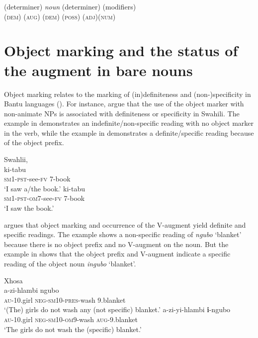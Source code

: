 \documentclass[output=paper]{langscibook}
\begin{document}
\ea\label{ex:lusekelo:51}
\gll (determiner)  \textit{noun}  (determiner)  (modifiers)\\
  {(\textsc{dem}) (\textsc{aug})}  {}  {(\textsc{dem}) (\textsc{poss})}  {(\textsc{adj})(\textsc{num})}\\
\z

\section{Object marking and the status of the augment in bare nouns} 
\label{sec:lusekelo:4}
Object marking relates to the marking of (in)definiteness and (non-)specificity in Bantu languages (\citealt{MartenEtAl2007, Riedel2009, MartenKula2012, Visser2010, Kimambo2018b}). For instance, \citet[242]{MartenKula2012} argue that the use of the object marker with non-animate NPs is associated with definiteness or specificity in Swahili. The example in  demonstrates an indefinite/non-specific reading with no object marker in the verb, while the example in  demonstrates a definite/specific reading because of the object prefix. 

\ea%
    \label{ex:lusekelo:52}
    Swahlii, \citet[242]{MartenKula2012}\\
  {ki-tabu} \\
  \textsc{sm1-pst}{}-see-\textsc{fv}  7-book \\
\glt  ‘I saw a/the book.’ 
\ex%
    \label{ex:lusekelo:53}
       {ki-tabu} \\
  \textsc{sm1-pst-}{\textsc{om7}}{}-see-\textsc{fv}    7-book \\
\glt  ‘I saw the book.’ 
\z

\citet{Visser2010} argues that object marking and occurrence of the V-aug\-ment yield definite and specific readings. The example  shows a non-specific reading of \textit{ngubo} ‘blanket’ because there is no object prefix and no V-aug\-ment on the noun. But the example in  shows that the object prefix and V-aug\-ment indicate a specific reading of the object noun \textit{ingubo} ‘blanket’.  

\newpage
\ea%
    Xhosa \citep[302]{Visser2010}\label{ex:lusekelo:54}\\
    {a-zi-hlambi}    {ngubo}\\ 
  \textsc{au}{}-10.girl  \textsc{neg}-\textsc{sm}10-\textsc{pres}-wash  9.blanket\\ 
\glt  ‘(The) girls do not wash any (not specific) blanket.’ 
\ex%
    \label{ex:lusekelo:55}
     {a-zi-yi-hlambi}    {\textbf{i}-ngubo}   \\
  \textsc{au}{}-10.girl  \textsc{neg}-\textsc{sm}10-\textsc{om}9-wash  \textsc{aug}{}-9.blanket    \\
\glt  ‘The girls do not wash the (specific) blanket.’
\z
\end{document}
